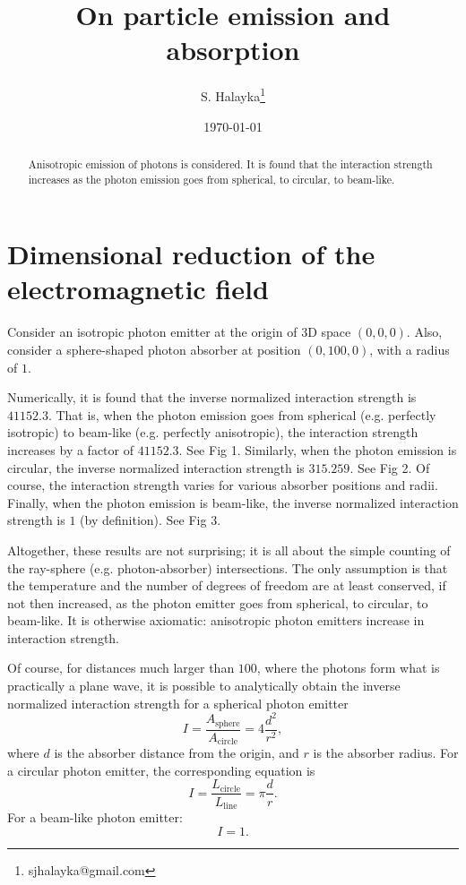 \documentclass[12pt]{article}
\title{On particle emission and absorption}
\author{S. Halayka\footnote{sjhalayka@gmail.com}}
\date{\today}
\begin{document}
\maketitle

\begin{abstract}
Anisotropic emission of photons is considered.
It is found that the interaction strength increases as the photon emission goes from spherical, to circular, to beam-like.
\end{abstract}



\section{Dimensional reduction of the electromagnetic field}
Consider an isotropic photon emitter at the origin of 3D space $(0, 0, 0)$.
Also, consider a sphere-shaped photon absorber at position $(0, 100, 0)$, with a radius of $1$.

Numerically, it is found that the inverse normalized interaction strength is $41152.3$.
That is, when the photon emission goes from spherical (e.g. perfectly isotropic) to beam-like (e.g. perfectly anisotropic), the interaction strength increases by a factor of $41152.3$.
See Fig 1.
Similarly, when the photon emission is circular, the inverse normalized interaction strength is $315.259$.
See Fig 2.
Of course, the interaction strength varies for various absorber positions and radii.
Finally, when the photon emission is beam-like, the inverse normalized interaction strength is $1$ (by definition).
See Fig 3.

Altogether, these results are not surprising; it is all about the simple counting of the ray-sphere (e.g. photon-absorber) intersections. 
The only assumption is that the temperature and the number of degrees of freedom are at least conserved, if not then increased, as the photon emitter goes from spherical, to circular, to beam-like.
It is otherwise axiomatic: anisotropic photon emitters increase in interaction strength.

Of course, for distances much larger than $100$, where the photons form what is practically a plane wave, it is possible to analytically obtain the inverse normalized interaction strength for a spherical photon emitter
\begin{equation}
I = \frac{ A_{{\textrm{sphere}}} }{ A_{{\textrm{circle}}} } = 4 \frac{d^2}{r^2},
\end{equation}
where $d$ is the absorber distance from the origin, and $r$ is the absorber radius.
For a circular photon emitter, the corresponding equation is
\begin{equation}
I =  \frac{ L_{{\textrm{circle}}} }{ L_{{\textrm{line}}} }  =  \pi \frac{d}{r}.
\end{equation}
For a beam-like photon emitter:
\begin{equation}
I = 1.
\end{equation}
\end{document}
